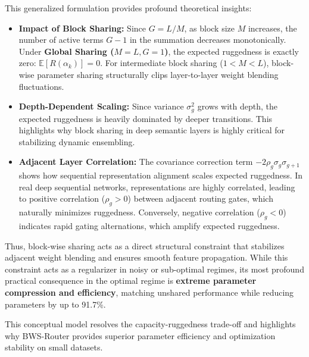 This generalized formulation provides profound theoretical insights:
\begin{itemize}
    \item \textbf{Impact of Block Sharing:} Since $G = L/M$, as block size $M$ increases, the number of active terms $G-1$ in the summation decreases monotonically. Under \textbf{Global Sharing ($M=L, G=1$)}, the expected ruggedness is exactly zero: $\mathbb{E}[R(\alpha_k)] = 0$. For intermediate block sharing ($1 < M < L$), block-wise parameter sharing structurally clips layer-to-layer weight blending fluctuations.
    \item \textbf{Depth-Dependent Scaling:} Since variance $\sigma_g^2$ grows with depth, the expected ruggedness is heavily dominated by deeper transitions. This highlights why block sharing in deep semantic layers is highly critical for stabilizing dynamic ensembling.
    \item \textbf{Adjacent Layer Correlation:} The covariance correction term $-2 \rho_g \sigma_g \sigma_{g+1}$ shows how sequential representation alignment scales expected ruggedness. In real deep sequential networks, representations are highly correlated, leading to positive correlation ($\rho_g > 0$) between adjacent routing gates, which naturally minimizes ruggedness. Conversely, negative correlation ($\rho_g < 0$) indicates rapid gating alternations, which amplify expected ruggedness.
\end{itemize}
Thus, block-wise sharing acts as a direct structural constraint that stabilizes adjacent weight blending and ensures smooth feature propagation. While this constraint acts as a regularizer in noisy or sub-optimal regimes, its most profound practical consequence in the optimal regime is \textbf{extreme parameter compression and efficiency}, matching unshared performance while reducing parameters by up to 91.7\%.

This conceptual model resolves the capacity-ruggedness trade-off and highlights why BWS-Router provides superior parameter efficiency and optimization stability on small datasets.

